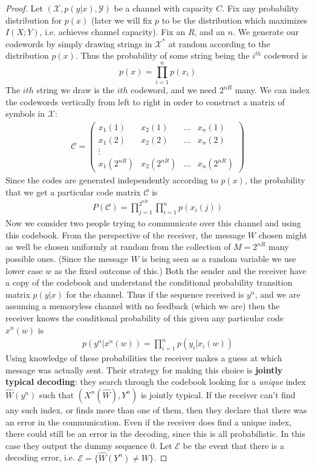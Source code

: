 \begin{proof}
	Let $(\mathcal{X},p(y|x),\mathcal{Y})$ be a channel with capacity $C$. Fix any probability distribution for $p(x)$ (later we will fix $p$ to be the distribution which maximizes $I(X;Y)$, i.e. achieves channel capacity). Fix an $R$, and an $n$. We generate our codewords by simply drawing strings in $\mathcal{X}^*$ at random according to the distribution $p(x)$. Thus the probability of some string being the $i^{th}$ codeword is 
	\[ p(x) = \prod_{i=1}^n p(x_i) \]
The $i{th}$ string we draw is the $i{th}$ codeword, and we need $2^{nR}$ many. We can index the codewords vertically from left to right in order to construct a matrix of symbols in $\mathcal{X}$:
\begin{align}
	\mathcal{C} = \begin{pmatrix} x_1(1) & x_2(1) & \ldots & x_n(1) 
	\\	x_1(2) & x_2(2) & \ldots & x_n(2) \\
	\vdots \\ x_1(2^{nR}) & x_2(2^{nR}) & \ldots & x_n(2^{nR}) \end{pmatrix}
\end{align}
Since the codes are generated independently according to $p(x)$, the probability that we get a particular code matrix $\mathcal{C}$ is 
\begin{align}
	P(\mathcal{C}) = \prod_{j=1}^{2^{nR}}\prod_{i=1}^np(x_i(j))
\end{align}
Now we consider two people trying to communicate over this channel and using this codebook. From the perspective of the receiver, the message $W$ chosen might as well be chosen uniformly at random from the collection of $M=2^{nR}$ many possible ones. (Since the message $W$ is being seen as a random variable we use lower case $w$ as the fixed outcome of this.) Both the sender and the receiver have a copy of the codebook and understand the conditional probability transition matrix $p(y|x)$ for the channel. Thus if the sequence received is $y^n$, and we are assuming a memoryless channel with no feedback (which we are) then the receiver knows the conditional probability of this given any particular code $x^n(w)$ is 
\begin{align}
	p(y^n|x^n(w)) = \prod_{i=1}^n p(y_i|x_i(w))
\end{align}
Using knowledge of these probabilities the receiver makes a guess at which message was actually sent. Their strategy for making this choice is \textbf{jointly typical decoding}: they search through the codebook looking for a \emph{unique} index $\hat{W}(y^n)$ such that $(X^n(\hat{W}),Y^n)$ is jointly typical. If the receiver can't find any such index, or finds more than one of them, then they declare that there was an error in the communication. Even if the receiver does find a unique index, there could still be an error in the decoding, since this is all probabilistic. In this case they output the dummy sequence $0$. Let $\mathcal{E}$ be the event that there is a decoding error, i.e. $\mathcal{E} = \{\hat{W}(Y^n) \neq W\}$. 

\end{proof}
